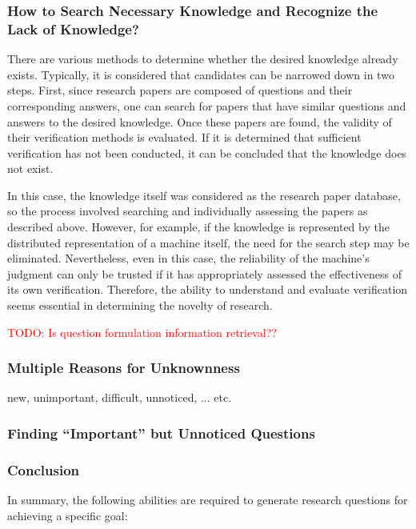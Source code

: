 \documentclass{book}
\begin{document}
\subsubsection{How to Search Necessary Knowledge and Recognize the Lack of Knowledge?}
There are various methods to determine whether the desired knowledge already exists. Typically, it is considered that candidates can be narrowed down in two steps. First, since research papers are composed of questions and their corresponding answers, one can search for papers that have similar questions and answers to the desired knowledge. Once these papers are found, the validity of their verification methods is evaluated. If it is determined that sufficient verification has not been conducted, it can be concluded that the knowledge does not exist.

In this case, the knowledge itself was considered as the research paper database, so the process involved searching and individually assessing the papers as described above. However, for example, if the knowledge is represented by the distributed representation of a machine itself, the need for the search step may be eliminated. Nevertheless, even in this case, the reliability of the machine's judgment can only be trusted if it has appropriately assessed the effectiveness of its own verification. Therefore, the ability to understand and evaluate verification seems essential in determining the novelty of research.

\textcolor{red}{TODO: Is question formulation information retrieval??}

\subsubsection{Multiple Reasons for Unknownness}
new, unimportant, difficult, unnoticed, ... etc.

\subsubsection{Finding ``Important'' but Unnoticed Questions}

\subsubsection{Conclusion}
In summary, the following abilities are required to generate research questions for achieving a specific goal:
\end{document}
